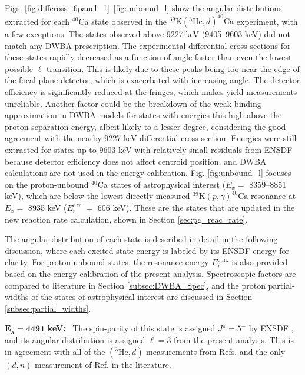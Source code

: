 Figs. \ref{fig:diffcross_6panel_1}--\ref{fig:unbound_l} show the angular distributions extracted for each $^{40}$Ca state observed in the $^{39}\mathrm{K}(^{3}\mathrm{He}, d)^{40}\mathrm{Ca}$ experiment, with a few exceptions. The states observed above 9227 keV (9405--9603 keV) did not match any DWBA prescription. The experimental differential cross sections for these states rapidly decreased as a function of angle faster than even the lowest possible $\ell$ transition. This is likely due to these peaks being too near the edge of the focal plane detector, which is exacerbated with increasing angle. The detector efficiency is significantly reduced at the fringes, which makes yield measurements unreliable. Another factor could be the breakdown of the weak binding approximation in DWBA models for states with energies this high above the proton separation energy, albeit likely to a lesser degree, considering the good agreement with the nearby 9227 keV differential cross section. Energies were still extracted for states up to 9603 keV with relatively small residuals from ENSDF \cite{Chen2017} because detector efficiency does not affect centroid position, and DWBA calculations are not used in the energy calibration. Fig. \ref{fig:unbound_l} focuses on the proton-unbound $^{40}$Ca states of astrophysical interest ($E_{x} =$ 8359--8851 keV), which are below the lowest directly measured $^{39}\mathrm{K}(p, \gamma)^{40}\mathrm{Ca}$ resonance at $E_{x} =$ 8935 keV ($E_{r}^{\mathrm{c.m.}} =$ 606 keV). These are the states that are updated in the new reaction rate calculation, shown in Section \ref{sec:pg_reac_rate}. 

The angular distribution of each state is described in detail in the following discussion, where each excited state energy is labeled by its ENSDF \cite{Chen2017} energy for clarity. For proton-unbound states, the resonance energy $E_{r}^{\mathrm{c.m.}}$ is also provided based on the energy calibration of the present analysis. Spectroscopic factors are compared to literature in Section \ref{subsec:DWBA_Spec}, and the proton partial-widths of the states of astrophysical interest are discussed in Section \ref{subsec:partial_widths}.

\emph{$\mathbf{E_{x} = 4491}$} \textbf{keV:} \, 
The spin-parity of this state is assigned $J^{\pi} = 5^{-}$ by ENSDF \cite{Chen2017}, and its angular distribution is assigned $\ell=3$ from the present analysis. This is in agreement with all of the $(^{3}\mathrm{He}, d)$ measurements from Refs. \cite{Erskine1966,Seth1967,Forster1970,Cage1971} and the only $(d, n)$ measurement of Ref. \cite{Fuchs1969} in the literature.

